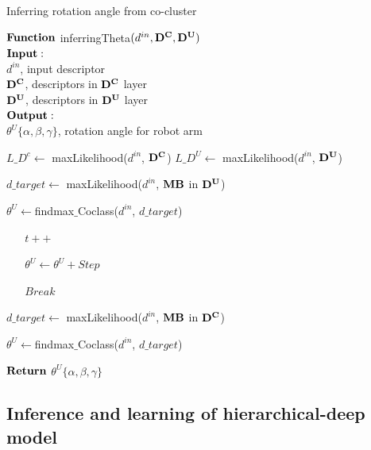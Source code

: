 \documentclass[journal]{IEEEtran}
\begin{document}
\begin{algorithm}
  \caption{Inferring rotation angle from co-cluster}
   $\bf{Function}$ inferringTheta$(d^{in},\bf{D^C},\bf{D^U})$\\ 
  $\bf{Input:}$\\
   $d^{in}$, input descriptor\\
   $\bf{D^C}$, descriptors in $\bf{D^C}$ layer\\
   $\bf{D^U}$, descriptors in $\bf{D^U}$ layer\\
  $\bf{Output:}$\\
  $\theta^U\{\alpha,\beta,\gamma\}$, rotation angle for robot arm\\        
  \begin{algorithmic}[1]
    \State $L\_{D^c} \leftarrow$ maxLikelihood($d^{in}$, $\bf{D^C}$)
    \State $L\_{D^U} \leftarrow$ maxLikelihood($d^{in}$, $\bf{D^U}$)
    
 	$d\_target \leftarrow $ maxLikelihood($d^{in}$, $\bf{MB}$ in $\bf{D^U}$)
 		
 	$\theta^U\leftarrow$findmax$\_$Coclass($d^{in}$, $d\_target$)
 	
 		
 			
 				$\;\;\;\;\;\;t++$
 				
 				$\;\;\;\;\;\;\theta^U \leftarrow \theta^U+Step$
 				
 			\Else
 			
 				$\;\;\;\;\;\;Break$
 			\EndIf
 		
 		
 		
    	\EndWhile
    \Else
    
    	$d\_target \leftarrow $ maxLikelihood($d^{in}$, $\bf{MB}$ in $\bf{D^C}$)
    	
    	$\theta^U\leftarrow$findmax$\_$Coclass($d^{in}$, $d\_target$)
    \EndIf
    
	\State $\bf{Return}$ $\theta^U\{\alpha,\beta,\gamma\}$
    
  \end{algorithmic}
\end{algorithm}

\subsection{Inference and learning of hierarchical-deep model}
\end{document}
